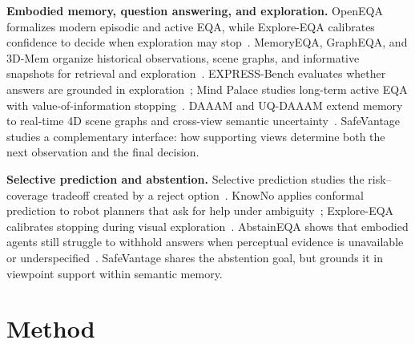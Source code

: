 \documentclass{article}
\newcommand{\method}{SafeVantage}
\begin{document}
\textbf{Embodied memory, question answering, and exploration.}
OpenEQA formalizes modern episodic and active EQA, while Explore-EQA calibrates confidence to decide when exploration may stop~\citep{majumdar2024openeqa,exploreeqa2024}. MemoryEQA, GraphEQA, and 3D-Mem organize historical observations, scene graphs, and informative snapshots for retrieval and exploration~\citep{memoryeqa2025,saxena2025grapheqa,yang2024threedmem}. EXPRESS-Bench evaluates whether answers are grounded in exploration~\citep{jiang2025express}; Mind Palace studies long-term active EQA with value-of-information stopping~\citep{ginting2025mindpalace}. DAAAM and UQ-DAAAM extend memory to real-time 4D scene graphs and cross-view semantic uncertainty~\citep{gorlo2025daaam,zhang2026uqdaaam}. \method{} studies a complementary interface: how supporting views determine both the next observation and the final decision.


\textbf{Selective prediction and abstention.}
Selective prediction studies the risk--coverage tradeoff created by a reject option~\citep{geifman2019selectivenet}. KnowNo applies conformal prediction to robot planners that ask for help under ambiguity~\citep{ren2023knowno}; Explore-EQA calibrates stopping during visual exploration~\citep{exploreeqa2024}. AbstainEQA shows that embodied agents still struggle to withhold answers when perceptual evidence is unavailable or underspecified~\citep{wu2026abstaineqa}. \method{} shares the abstention goal, but grounds it in viewpoint support within semantic memory.

\section{Method}
\end{document}
